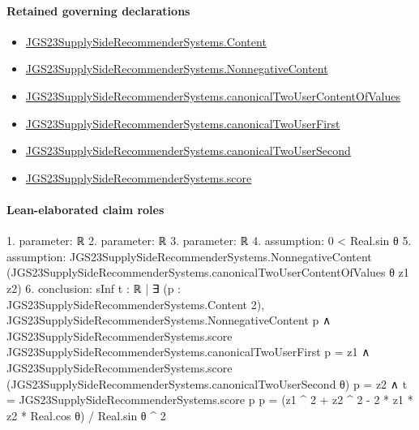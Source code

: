 \documentclass[10pt]{article}
\begin{document}
\paragraph{Retained governing declarations}
\begin{itemize}\raggedright
\item \hyperlink{governing-declaration-367305fda50f0ada}{JGS23\allowbreak{}Supply\allowbreak{}Side\allowbreak{}Recommender\allowbreak{}Systems.\allowbreak{}Content}
\item \hyperlink{governing-declaration-d426babe40b9593c}{JGS23\allowbreak{}Supply\allowbreak{}Side\allowbreak{}Recommender\allowbreak{}Systems.\allowbreak{}Nonnegative\allowbreak{}Content}
\item \hyperlink{governing-declaration-7ec7c4b0b62e0ca8}{JGS23\allowbreak{}Supply\allowbreak{}Side\allowbreak{}Recommender\allowbreak{}Systems.\allowbreak{}canonical\allowbreak{}Two\allowbreak{}User\allowbreak{}Content\allowbreak{}Of\allowbreak{}Values}
\item \hyperlink{governing-declaration-abb7b5a1ce6f14ba}{JGS23\allowbreak{}Supply\allowbreak{}Side\allowbreak{}Recommender\allowbreak{}Systems.\allowbreak{}canonical\allowbreak{}Two\allowbreak{}User\allowbreak{}First}
\item \hyperlink{governing-declaration-fb292a037babdd07}{JGS23\allowbreak{}Supply\allowbreak{}Side\allowbreak{}Recommender\allowbreak{}Systems.\allowbreak{}canonical\allowbreak{}Two\allowbreak{}User\allowbreak{}Second}
\item \hyperlink{governing-declaration-e3725af4eb21c4db}{JGS23\allowbreak{}Supply\allowbreak{}Side\allowbreak{}Recommender\allowbreak{}Systems.\allowbreak{}score}
\end{itemize}
\paragraph{Lean-elaborated claim roles}\begin{ReviewVerbatim}
1. parameter: ℝ
2. parameter: ℝ
3. parameter: ℝ
4. assumption: 0 < Real.sin θ
5. assumption: JGS23SupplySideRecommenderSystems.NonnegativeContent
  (JGS23SupplySideRecommenderSystems.canonicalTwoUserContentOfValues θ z1 z2)
6. conclusion: sInf
    {t : ℝ |
      ∃ (p : JGS23SupplySideRecommenderSystems.Content 2),
        JGS23SupplySideRecommenderSystems.NonnegativeContent p ∧
          JGS23SupplySideRecommenderSystems.score JGS23SupplySideRecommenderSystems.canonicalTwoUserFirst p = z1 ∧
            JGS23SupplySideRecommenderSystems.score (JGS23SupplySideRecommenderSystems.canonicalTwoUserSecond θ) p =
                z2 ∧
              t = JGS23SupplySideRecommenderSystems.score p p} =
  (z1 ^ 2 + z2 ^ 2 - 2 * z1 * z2 * Real.cos θ) / Real.sin θ ^ 2
\end{ReviewVerbatim}
\end{document}

